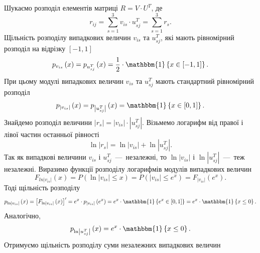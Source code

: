 Шукаємо розподіл елементів матриці $R = V \cdot U^T$, де
\begin{equation*}
  r_{ij} =
  \sum \limits_{s = 1}^3 v_{is} \cdot u_{sj}^T =
  \sum \limits_{s = 1}^3 r_s.
\end{equation*}
Щільність розподілу випадкових величин $v_{is}$ та $u_{sj}^T$,
які мають рівномірний розподіл на відрізку $\left[ -1, 1 \right] $
\begin{equation*}
  p_{v_{is}} \left( x \right) =
  p_{u_{sj}^T} \left( x \right) =
  \frac{1}{2} \cdot \mathbbm{1} \left\{ x \in \left[ -1, 1 \right] \right\}.
\end{equation*}
При цьому модулі випадкових величин $v_{is}$ та $u_{sj}^T$
мають стандартний рівномірний розподіл
\begin{equation*}
  p_{\left| v_{is} \right|} \left( x \right) =
  p_{\left| u_{sj}^T \right|} \left( x \right) =
  \mathbbm{1} \left\{ x \in \left[ 0, 1 \right] \right\}.
\end{equation*}
Знайдемо розподіл величини
$ \left| r_s \right| = \left| v_{is} \right| \cdot \left| u_{sj}^T \right|$.
Візьмемо логарифм від правої і лівої частин останньої рівності
\begin{equation*}
  \ln \left| r_s \right| = \ln \left| v_{is} \right| + \ln \left| u_{sj}^T \right|.
\end{equation*}
Так як випадкові величини $v_{is}$ і $u_{sj}^T$~---~незалежні, то $\ln \left| v_{is} \right|$ і
$\ln \left| u_{sj}^T \right|$~---~теж незалежні.
Виразимо функції розподілу логарифмів модулів випадкових величин
\begin{equation*}
  F_{ln \left| v_{is} \right|} \left( x \right) =
  P \left( \ln \left| v_{is} \right| \leq x \right) =
  P \left( \left| v_{is} \right| \leq e^x \right) =
  F_{\left| v_{is} \right|} \left( e^x \right).
\end{equation*}
Тоді щільність розподілу
\begin{equation*}
  p_{\ln \left| v_{is} \right|} \left( x \right) =
  \left[ F_{\ln \left| v_{is} \right|} \left( x \right) \right]' =
  e^x \cdot p_{\left| v_{is} \right|} \left( e^x \right) =
  e^x \cdot \mathbbm{1} \left\{ e^x \in \left[ 0, 1 \right] \right\} =
  e^x \cdot \mathbbm{1} \left\{ x \leq 0 \right\}.
\end{equation*}
Аналогічно,
\begin{equation*}
  p_{\ln \left| u_{sj}^T \right|} \left( x \right) =
  e^x \cdot \mathbbm{1} \left\{ x \leq 0 \right\}.
\end{equation*}
Отримуємо щільність розподілу суми незалежних випадкових величин
